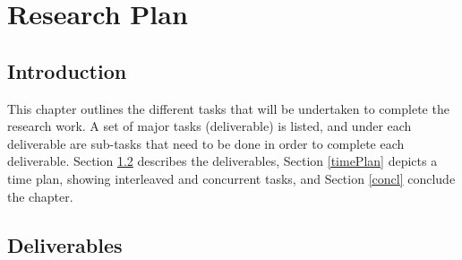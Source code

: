 %
%
%

\chapter{Research Plan}
\section{Introduction}
This chapter outlines the different tasks that will be undertaken to complete the research work. A set of major tasks (deliverable) is listed, and under each deliverable are sub-tasks that need to be done in order to complete each deliverable. Section \ref{deliverables} describes the deliverables, Section \ref{timePlan} depicts a time plan, showing interleaved and concurrent tasks, and Section \ref{concl} conclude the chapter.

\section{Deliverables} \label{deliverables}

